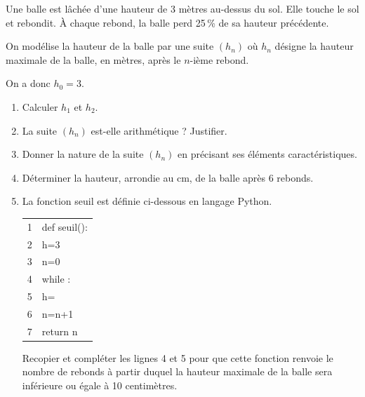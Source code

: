 \medskip

Une balle est lâchée d'une hauteur de 3 mètres au-dessus du sol. Elle touche le sol et rebondit. À chaque rebond, la balle perd 25\,\% de sa hauteur précédente.

On modélise la hauteur de la balle par une suite $\left(h_n\right)$ où $h_n$ désigne la hauteur maximale de la balle, en mètres, après le $n$-ième rebond. 

On a donc $h_0=3$.

\medskip

\begin{enumerate}
\item  Calculer $h_1$ et $h_2$.
\item La suite $\left(h_n\right)$ est-elle arithmétique ? Justifier.
\item Donner la nature de la suite $\left(h_n\right)$ en précisant ses éléments caractéristiques.
\item Déterminer la hauteur, arrondie au cm, de la balle après 6 rebonds.
\item La fonction \og seuil \fg{} est définie ci-dessous en langage Python.

\begin{center}
\renewcommand\arraystretch{0.95}
\begin{tabular}[]{|c m{3.5cm}|}
\hline
1&def seuil():\\
2&\hspace{2em} h=3\\
3& \hspace{2em}n=0\\
4& \hspace{2em}while \dotfill :\\
5& \hspace{3.75em}h=\dotfill\\
6& \hspace{3.75em}n=n+1\\
7&\hspace{2em} return n\\\hline
\end{tabular}
\end{center}


Recopier et compléter les lignes 4 et 5 pour que cette fonction renvoie le nombre de rebonds à partir duquel la hauteur maximale de la balle sera inférieure ou égale à 10 centimètres.
\end{enumerate}

\vspace{0,5cm}
